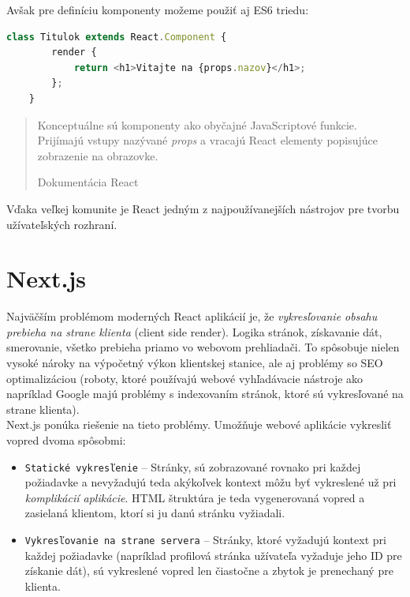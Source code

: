 \bigskip

\noindent Avšak pre definíciu komponenty možeme použiť aj ES6 triedu: \\

\begin{lstlisting}[language=TypeScript, caption=Príklad definície triednej komponenty.]
	class Titulok extends React.Component {
		render {
			return <h1>Vitajte na {props.nazov}</h1>;
		};
	}
\end{lstlisting}

\bigskip

\blockquote[Dokumentácia React \cite{React}]{Konceptuálne sú komponenty ako obyčajné JavaScriptové funkcie. Prijímajú vstupy nazývané \emph{props} a vracajú React elementy popisujúce zobrazenie na obrazovke.}

\noindent Vďaka veľkej komunite je React jedným z najpoužívanejších nástrojov pre tvorbu užívateľských rozhraní. 

\section{Next.js}
\label{theory:nextjs}
Najväčším problémom moderných React aplikácií je, že \emph{vykresľovanie obsahu prebieha na strane klienta} (client side render). Logika stránok, získavanie dát, smerovanie, všetko prebieha priamo vo webovom prehliadači. To spôsobuje nielen vysoké nároky na výpočetný výkon klientskej stanice, ale aj problémy so SEO optimalizáciou (roboty, ktoré používajú webové vyhľadávacie nástroje ako napríklad Google majú problémy s indexovaním stránok, ktoré sú vykresľované na strane klienta). \\

\noindent Next.js ponúka riešenie na tieto problémy. Umožňuje webové aplikácie vykresliť vopred dvoma spôsobmi:

\begin{itemize}
	\item \texttt{Statické vykresľenie} -- Stránky, sú zobrazované rovnako pri každej požiadavke a nevyžadujú teda akýkoľvek kontext môžu byť vykreslené už pri \emph{komplikácií aplikácie}. HTML štruktúra je teda vygenerovaná vopred a zasielaná klientom, ktorí si ju danú stránku vyžiadali.
	\item \texttt{Vykresľovanie na strane servera} -- Stránky, ktoré vyžadujú kontext pri každej požiadavke (napríklad profilová stránka užívateľa vyžaduje jeho ID pre získanie dát), sú vykreslené vopred len čiastočne a zbytok je prenechaný pre klienta.
\end{itemize}

